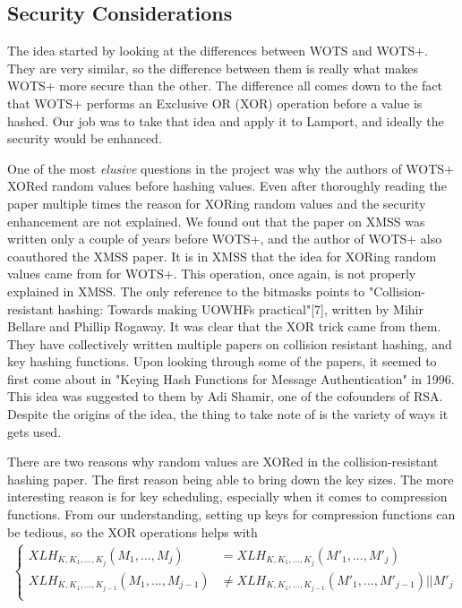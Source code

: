 \documentclass[]{scrartcl}
\begin{document}
\subsection*{Security Considerations}
The idea started by looking at the differences between WOTS and WOTS+. They are very similar, so the difference between them is really what makes WOTS+ more secure than the other. The difference all comes down to the fact that WOTS+ performs an Exclusive OR (XOR) operation before a value is hashed. Our job was to take that idea and apply it to Lamport, and ideally the security would be enhanced.

One of the most \textit{elusive} questions in the project was why the authors of WOTS+ XORed random values before hashing values. Even after thoroughly reading the paper multiple times the reason for XORing random values and the security enhancement are not explained. We found out that the paper on XMSS was written only a couple of years before WOTS+, and the author of WOTS+ also coauthored the XMSS paper. It is in XMSS that the idea for XORing random values came from for WOTS+. This operation, once again, is not properly explained in XMSS. The only reference to the bitmasks points to "Collision-resistant hashing: Towards making UOWHFs practical"[7], written by Mihir Bellare and Phillip Rogaway. It was clear that the XOR trick came from them. They have collectively written multiple papers on collision resistant hashing, and key hashing functions. Upon looking through some of the papers, it seemed to first come about in "Keying Hash Functions for Message Authentication" in 1996. This idea was suggested to them by Adi Shamir, one of the cofounders of RSA. Despite the origins of the idea, the thing to take note of is the variety of ways it gets used.

There are two reasons why random values are XORed in the collision-resistant hashing paper. The first reason being able to bring down the key sizes. The more interesting reason is for key scheduling, especially when it comes to compression functions. From our understanding, setting up keys for compression functions can be tedious, so the XOR operations helps with 
\begin{equation}
\begin{split}
\begin{cases}
XLH_{K,K_1,...,K_j}(M_1,...,M_j) & =  XLH_{K,K_1,...,K_j}(M'_1,...,M'_j)\\
XLH_{K,K_1,...,K_{j-1}}(M_1,...,M_{j-1}) & \neq XLH_{K,K_1,...,K_{j-1}}(M'_1,...,M'_{j-1}) || M'_j\\
\end{cases}
\end{split}
\end{equation}
\end{document}
